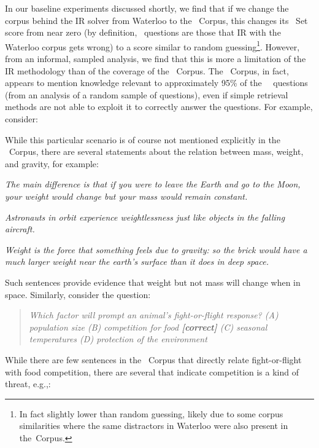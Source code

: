 In our baseline experiments discussed shortly, we find that if we change the corpus behind the IR solver from Waterloo to the \ASC~Corpus, this changes its \Challenge~Set score from near zero (by definition,
\Challenge~questions are those that IR with the Waterloo corpus gets wrong) to a score similar to random guessing\footnote{
  In fact slightly lower than random guessing, likely due to some corpus similarities where the same distractors in Waterloo were also present in the\ASC~Corpus.}.
However, from an informal, sampled analysis, we find that this is more a limitation of the IR methodology than of the coverage of the \ASC~Corpus. The \ASC~Corpus,
in fact, appears to mention knowledge relevant to approximately 95\% of the \ASC~\Challenge~questions (from an analysis of a random sample of questions), even if simple retrieval methods are not able to exploit it to correctly answer the questions. For example, consider:

\begin{quote}

\end{quote}

While this particular scenario is of course not mentioned explicitly in the \ASC~Corpus, there are several statements about the relation between mass, weight, and gravity, for example:

\begin{ite}
\item {\it The main difference is that if you were to leave the Earth and go to the Moon, your weight would change but your mass would remain constant.}
\item {\it Astronauts in orbit experience weightlessness just like objects in the falling aircraft.}
\item {\it Weight is the force that something feels due to gravity: so the brick would have a much larger weight near the earth's surface than it does in deep space.}
\end{ite}

Such sentences provide evidence that weight but not mass will change when in space. Similarly, consider the question:

\begin{quote}
{\it Which factor will prompt an animal's fight-or-flight response? (A) population size (B) competition for food \textbf{\textit{[correct]}} (C) seasonal temperatures (D) protection of the environment}
\end{quote}

While there are few sentences in the \ASC~Corpus that directly relate fight-or-flight with food competition, there are several that indicate competition is a kind of threat, e.g.,:

